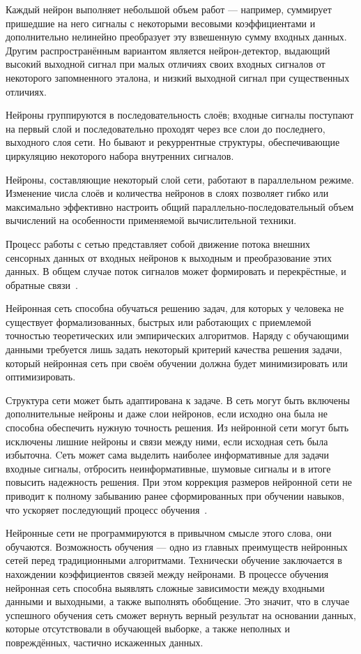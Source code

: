 Каждый нейрон выполняет небольшой объем работ --- например, суммирует пришедшие на него сигналы с некоторыми весовыми коэффициентами и дополнительно нелинейно преобразует эту взвешенную сумму входных данных.
Другим распространённым вариантом является нейрон-детектор, выдающий высокий выходной сигнал при малых отличиях своих входных сигналов от некоторого запомненного эталона, и низкий выходной сигнал при существенных отличиях.

Нейроны группируются в последовательность слоёв; входные сигналы поступают на первый слой и последовательно проходят через все слои до последнего, выходного слоя сети.
Но бывают и рекуррентные структуры, обеспечивающие циркуляцию некоторого набора внутренних сигналов.

Нейроны, составляющие некоторый слой сети, работают в параллельном режиме.
Изменение числа слоёв и количества нейронов в слоях позволяет гибко или максимально эффективно настроить общий параллельно-последовательный объем вычислений на особенности применяемой вычислительной техники.

Процесс работы с сетью представляет собой движение потока внешних сенсорных данных от входных нейронов к выходным и преобразование этих данных.
В общем случае поток сигналов может формировать и перекрёстные, и обратные связи~\cite{domain_neuropro}.

Нейронная сеть способна обучаться решению задач, для которых у человека не существует формализованных, быстрых или работающих с приемлемой точностью теоретических или эмпирических алгоритмов.
Наряду с обучающими данными требуется лишь задать некоторый критерий качества решения задачи, который нейронная сеть при своём обучении должна будет минимизировать или оптимизировать.

Структура сети может быть адаптирована к задаче.
В сеть могут быть включены дополнительные нейроны и даже слои нейронов, если исходно она была не способна обеспечить нужную точность решения.
Из нейронной сети могут быть исключены лишние нейроны и связи между ними, если исходная сеть была избыточна.
Cеть может сама выделить наиболее информативные для задачи входные сигналы, отбросить неинформативные, шумовые сигналы и в итоге повысить надежность решения.
При этом коррекция размеров нейронной сети не приводит к полному забыванию ранее сформированных при обучении навыков, что ускоряет последующий процесс обучения~\cite{domain_neuropro}.

Нейронные сети не программируются в привычном смысле этого слова, они обучаются.
Возможность обучения — одно из главных преимуществ нейронных сетей перед традиционными алгоритмами.
Технически обучение заключается в нахождении коэффициентов связей между нейронами.
В процессе обучения нейронная сеть способна выявлять сложные зависимости между входными данными и выходными, а также выполнять обобщение. Это значит, что в случае успешного обучения сеть сможет вернуть верный результат на основании данных, которые отсутствовали в обучающей выборке, а также неполных и повреждённых, частично искаженных данных.

